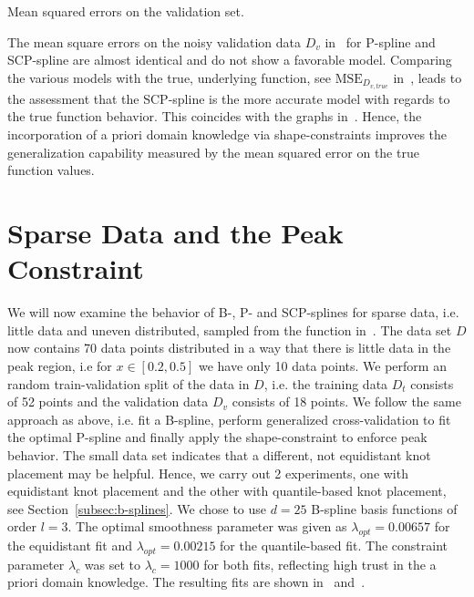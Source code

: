 \begin{table}[H]
	\begin{center}
	\end{center}
	\caption{Mean squared errors on the validation set.}
	\label{tab:test-func-peak-mses}
\end{table}
%
The mean square errors on the noisy validation data $D_v$ in~ for P-spline and SCP-spline are almost identical and do not show a favorable model. Comparing the various models with the true, underlying function, see $\text{MSE}_{D_{v,true}}$ in~, leads to the assessment that the SCP-spline is the more accurate model with regards to the true function behavior. This coincides with the graphs in~. Hence, the incorporation of a priori domain knowledge via shape-constraints improves the generalization capability measured by the mean squared error on the true function values. 

\section{Sparse Data and the Peak Constraint}

We will now examine the behavior of B-, P- and SCP-splines for sparse data, i.e. little data and uneven distributed, sampled from the function in~. The data set $D$ now contains 70 data points distributed in a way that there is little data in the peak region, i.e for $x \in [0.2, 0.5]$ we have only 10 data points. We perform an random train-validation split of the data in $D$, i.e. the training data $D_t$ consists of 52 points and the validation data $D_v$ consists of 18 points. We follow the same approach as above, i.e. fit a B-spline, perform generalized cross-validation to fit the optimal P-spline and finally apply the shape-constraint to enforce peak behavior. The small data set indicates that a different, not equidistant knot placement may be helpful. Hence, we carry out 2 experiments, one with equidistant knot placement and the other with quantile-based knot placement, see Section~\ref{subsec:b-splines}. We chose to use $d=25$ B-spline basis functions of order $l=3$. The optimal smoothness parameter was given as $\lambda_{opt} = 0.00657$ for the equidistant fit and $\lambda_{opt} = 0.00215$ for the quantile-based fit. The constraint parameter $\lambda_c$ was set to $\lambda_c=1000$ for both fits, reflecting high trust in the a priori domain knowledge. The resulting fits are shown in~ and~.


